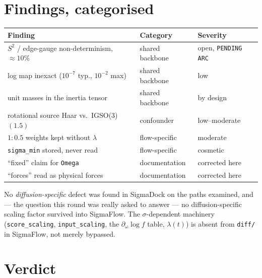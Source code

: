 \documentclass[11pt,a4paper]{report}
\theoremstyle{definition}
\theoremstyle{remark}
\newcommand{\file}[1]{\texttt{#1}}
\newcommand{\pyfunc}[1]{\texttt{#1}}
\begin{document}
\section{Findings, categorised}
\label{sec:engine-findings}

\begin{center}
\begin{tabular}{lll}
\toprule
Finding & Category & Severity \\
\midrule
$S^2$ / edge-gauge non-determinism, $\approx10\%$ & shared backbone & open, \texttt{PENDING ARC} \\
log map inexact ($10^{-7}$ typ., $10^{-2}$ max) & shared backbone & low \\
unit masses in the inertia tensor & shared backbone & by design \\
\midrule
rotational source Haar vs.\ IGSO(3)$(1.5)$ & confounder & low--moderate \\
$1{:}0.5$ weights kept without $\lambda$ & flow-specific & moderate \\
\texttt{sigma\_min} stored, never read & flow-specific & cosmetic \\
\midrule
``fixed'' claim for \pyfunc{Omega} & documentation & corrected here \\
``forces'' read as physical forces & documentation & corrected here \\
\bottomrule
\end{tabular}
\end{center}

No \emph{diffusion-specific} defect was found in SigmaDock on the paths
examined, and --- the question this round was really asked to answer --- no
diffusion-specific scaling factor survived into SigmaFlow. The
$\sigma$-dependent machinery (\pyfunc{score\_scaling}, \pyfunc{input\_scaling},
the $\partial_\omega\log f$ table, $\lambda(t)$) is absent from
\file{diff/} in SigmaFlow, not merely bypassed.

\section{Verdict}
\label{sec:engine-verdict}

\begin{center}
\end{center}
\end{document}
